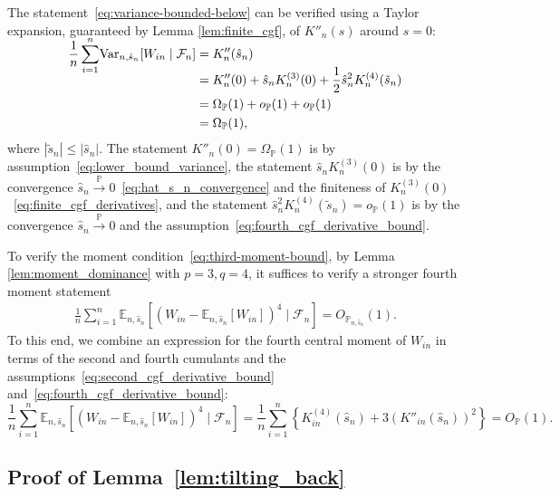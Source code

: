 \documentclass[12pt]{article}
\theoremstyle{definition}
\def\P{\mathbb{P}}
\def\P{\mathbb{P}}
\newcommand{\E}{\mathbb E}								%
\newcommand{\V}{\mathrm{Var}}							%
\renewcommand{\P}{\mathbb{P}}							%
\newcommand{\convp}{\overset{\mathbb{P}}{\rightarrow}}             %
\begin{document}
The statement~\eqref{eq:variance-bounded-below} can be verified using a Taylor expansion, guaranteed by Lemma \ref{lem:finite_cgf}, of $K''_{n}(s)$ around $s = 0$:
\begin{equation*}
\begin{split}
\smash{\frac{1}{n}\sum_{i = 1}^n} \V_{n, \hat s_n}[W_{in} \mid \mathcal F_n] &= K''_n(\hat s_n) \\
&= K''_n(0) + \hat s_n K^{(3)}_n(0) + \frac12 \hat s_n^2 K^{(4)}_n(\tilde s_n) \\
&= \Omega_\P(1) + o_\P(1) + o_\P(1) \\
&= \Omega_\P(1),
\end{split}
\end{equation*}
where $|\tilde s_n| \leq |\hat s_n|$. The statement $K''_n(0) = \Omega_\P(1)$ is by assumption~\eqref{eq:lower_bound_variance}, the statement $\hat s_n K^{(3)}_n(0)$ is by the convergence $\hat s_n \convp 0$~\eqref{eq:hat_s_n_convergence} and the finiteness of $K^{(3)}_n(0)$~\eqref{eq:finite_cgf_derivatives}, and the statement $\hat s_n^2 K^{(4)}_n(\tilde s_n) = o_\P(1)$ is by the convergence $\hat s_n \convp 0$ and the assumption~\eqref{eq:fourth_cgf_derivative_bound}. 

To verify the moment condition~\eqref{eq:third-moment-bound}, by Lemma \ref{lem:moment_dominance} with $p=3,q=4$, it suffices to verify a stronger fourth moment statement
\begin{align}
	\frac{1}{n}\sum_{i = 1}^n \E_{n, \hat s_n}[(W_{in} - \E_{n, \hat s_n}[W_{in}])^4 \mid \mathcal F_n] = O_{\P_{n, \hat s_n}}(1). \label{eq:bounded_fourth_moment}
\end{align}
To this end, we combine an expression for the fourth central moment of $W_{in}$ in terms of the second and fourth cumulants and the assumptions~\eqref{eq:second_cgf_derivative_bound} and~\eqref{eq:fourth_cgf_derivative_bound}:
\begin{equation*}
\frac{1}{n}\sum_{i = 1}^n \E_{n, \hat s_n}[(W_{in} - \E_{n, \hat s_n}[W_{in}])^4 \mid \mathcal F_n] = \frac{1}{n}\sum_{i = 1}^n \left\{K^{(4)}_{in}(\hat s_n) + 3(K''_{in}(\hat s_n))^2\right\} = O_\P(1).
\end{equation*}

\subsection{Proof of Lemma~\ref{lem:tilting_back}}
\end{document}
